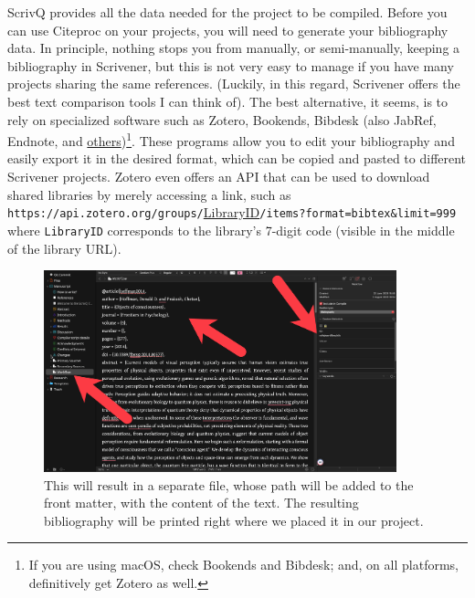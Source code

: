 \documentclass[
  12pt,
  a4paper,
  oneside,
  numbers=noenddot,
  titlepage,
  toclink=all,
  toc=bibliography]{scrbook}
\theoremstyle{definition}
\theoremstyle{definition}
\theoremstyle{definition}
\theoremstyle{plain}
\theoremstyle{plain}
\theoremstyle{plain}
\theoremstyle{plain}
\theoremstyle{plain}
\theoremstyle{remark}
\begin{document}
ScrivQ provides all the data needed for the project to be compiled.
Before you can use Citeproc on your projects, you will need to generate
your bibliography data. In principle, nothing stops you from manually,
or semi-manually, keeping a bibliography in Scrivener, but this is not
very easy to manage if you have many projects sharing the same
references. (Luckily, in this regard, Scrivener offers the best text
comparison tools I can think of). The best alternative, it seems, is to
rely on specialized software such as Zotero, Bookends, Bibdesk (also
JabRef, Endnote, and
\href{en.wikipedia.org/wiki/Comparison_of_reference_management_software}{others})\footnote{If
  you are using macOS, check Bookends and Bibdesk; and, on all
  platforms, definitively get Zotero as well.}. These programs allow you
to edit your bibliography and easily export it in the desired format,
which can be copied and pasted to different Scrivener projects. Zotero
even offers an API that can be used to download shared libraries by
merely accessing a link, such as
\texttt{https://api.zotero.org/groups/}\ul{LibraryID}\texttt{/items?format=bibtex\&limit=999}
where \texttt{LibraryID} corresponds to the library's 7-digit code
(visible in the middle of the library URL).

\begin{figure}

{\centering \includegraphics[width=4.02083in,height=2.30208in]{newbibliography.png}

}

\caption{\label{fig-scriv42A}This will result in a separate file, whose
path will be added to the front matter, with the content of the text.
The resulting bibliography will be printed right where we placed it in
our project.}

\end{figure}
\end{document}
